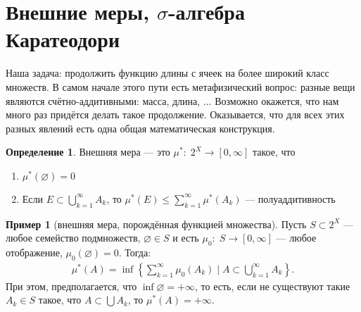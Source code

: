 \documentclass[a4paper,14pt]{extarticle}
\newcounter{theoremCnt}
\theoremstyle{definition}
\newtheorem{df}[theoremCnt]{Определение}
\theoremstyle{plain}
\theoremstyle{plain}
\theoremstyle{plain}
\theoremstyle{plain}
\theoremstyle{definition}
\newtheorem{exmpl}[theoremCnt]{Пример}
\theoremstyle{definition}
\theoremstyle{definition}
\theoremstyle{definition}
\theoremstyle{definition}
\theoremstyle{definition}
\theoremstyle{plain}
\theoremstyle{plain}
\theoremstyle{plain}
\theoremstyle{plain}
\theoremstyle{definition}
\theoremstyle{definition}
\theoremstyle{definition}
\theoremstyle{definition}
\theoremstyle{definition}
\begin{document}

\section{Внешние меры, $ \sigma $-алгебра Каратеодори}

Наша задача: продолжить функцию длины с ячеек на более широкий класс множеств. В самом начале этого пути есть метафизический вопрос: разные вещи являются счётно-аддитивными: масса, длина, ... Возможно окажется, что нам много раз придётся делать такое продолжение. Оказывается, что для всех этих разных явлений есть одна общая математическая конструкция.

\begin{df}
 Внешняя мера --- это $ \mu^\ast \colon\; 2^X \to [0, \infty] $ такое, что
 \begin{enumerate}
  \item $ \mu^\ast(\varnothing) = 0 $
  \item Если $ E \subset \displaystyle \bigcup_{k=1}^\infty A_k $, то $ \displaystyle \mu^\ast\left( E \right) \leqslant \sum_{k=1}^\infty \mu^\ast(A_k) $ --- полуаддитивность
 \end{enumerate}
\end{df}
\begin{exmpl}[внешняя мера, порождённая функцией множества]
 Пусть $ S \subset 2^X $ --- любое семейство подмножеств, $ \varnothing \in S $ и есть $ \mu_0 \colon\; S \to [0, \infty] $ --- любое отображение, $ \mu_0(\varnothing) = 0 $. Тогда:
 \begin{align*}
  \mu^\ast(A) = \inf \left\{ \sum_{k=1}^\infty \mu_0(A_k) \mid A \subset \bigcup_{k=1}^\infty A_k  \right\}
  .\end{align*} При этом, предполагается, что $ \inf \varnothing = +\infty $, то есть, если не существуют такие $ A_k \in S $ такое, что $ A \subset \bigcup A_k $, то $ \mu^\ast (A) = +\infty $.
\end{exmpl}
\end{document}
